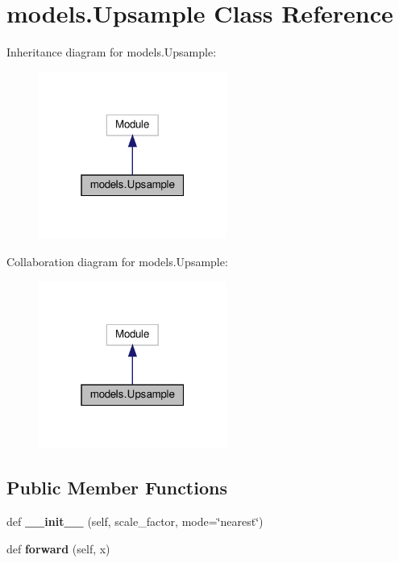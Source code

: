 \hypertarget{classmodels_1_1Upsample}{}\section{models.\+Upsample Class Reference}
\label{classmodels_1_1Upsample}


Inheritance diagram for models.\+Upsample\+:
\nopagebreak
\begin{figure}[H]
\begin{center}
\leavevmode
\includegraphics[width=175pt]{classmodels_1_1Upsample__inherit__graph}
\end{center}
\end{figure}


Collaboration diagram for models.\+Upsample\+:
\nopagebreak
\begin{figure}[H]
\begin{center}
\leavevmode
\includegraphics[width=175pt]{classmodels_1_1Upsample__coll__graph}
\end{center}
\end{figure}
\subsection*{Public Member Functions}
\begin{DoxyCompactItemize}
\item 
\mbox{\label{classmodels_1_1Upsample_aced93034f63746d4d2788e473b24945d}} 
def {\bfseries \+\_\+\+\_\+init\+\_\+\+\_\+} (self, scale\+\_\+factor, mode=\char`\"{}nearest\char`\"{})
\item 
\mbox{\label{classmodels_1_1Upsample_ae21c2e37d00f612f8408cb50a9e322b5}} 
def {\bfseries forward} (self, x)
\end{DoxyCompactItemize}
